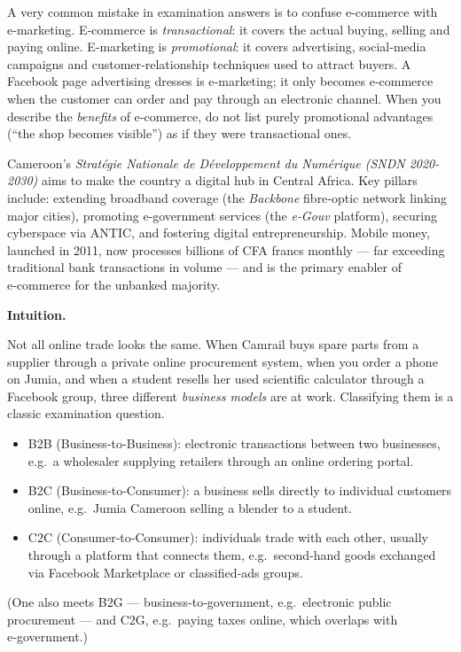 \documentclass[11pt]{article}
\newcommand{\cle}[1]{{\popxbold\color{popdark}#1}}
\newcounter{popsec}
\newcounter{popsub}
\newcommand{\courssub}[1]{%
  \stepcounter{popsub}%
  \par\vspace{9pt}\noindent{\popxbold\fontsize{11.5}{13}\selectfont\color{popink}{\color{poporange}\thepopsec.\thepopsub}\hspace{6pt}#1}\par\nopagebreak\vspace{4pt}
}
\begin{document}
\begin{attention}
A very common mistake in examination answers is to confuse \cle{e‑commerce} with \cle{e‑marketing}. E‑commerce is \emph{transactional}: it covers the actual buying, selling and paying online. E‑marketing is \emph{promotional}: it covers advertising, social‑media campaigns and customer‑relationship techniques used to attract buyers. A Facebook page advertising dresses is e‑marketing; it only becomes e‑commerce when the customer can order and pay through an electronic channel. When you describe the \emph{benefits} of e‑commerce, do not list purely promotional advantages (``the shop becomes visible'') as if they were transactional ones.
\end{attention}

\begin{savaistu}
Cameroon's \emph{Stratégie Nationale de Développement du Numérique (SNDN 2020-2030)} aims to make the country a digital hub in Central Africa. Key pillars include: extending broadband coverage (the \emph{Backbone} fibre‑optic network linking major cities), promoting e‑government services (the \emph{e‑Gouv} platform), securing cyberspace via ANTIC, and fostering digital entrepreneurship. Mobile money, launched in 2011, now processes billions of CFA francs monthly — far exceeding traditional bank transactions in volume — and is the primary enabler of e‑commerce for the unbanked majority.
\end{savaistu}

\courssub{E‑Commerce: Models and the Cameroonian Reality}

\textbf{Intuition.}\par
Not all online trade looks the same. When Camrail buys spare parts from a supplier through a private online procurement system, when you order a phone on Jumia, and when a student resells her used scientific calculator through a Facebook group, three different \emph{business models} are at work. Classifying them is a classic examination question.

\begin{definition}
\begin{itemize}
\item \cle{B2B} (Business‑to‑Business): electronic transactions between two businesses, e.g.\ a wholesaler supplying retailers through an online ordering portal.
\item \cle{B2C} (Business‑to‑Consumer): a business sells directly to individual customers online, e.g.\ Jumia Cameroon selling a blender to a student.
\item \cle{C2C} (Consumer‑to‑Consumer): individuals trade with each other, usually through a platform that connects them, e.g.\ second‑hand goods exchanged via Facebook Marketplace or classified‑ads groups.
\end{itemize}
(One also meets B2G — business‑to‑government, e.g.\ electronic public procurement — and C2G, e.g.\ paying taxes online, which overlaps with e‑government.)
\end{definition}
\end{document}
